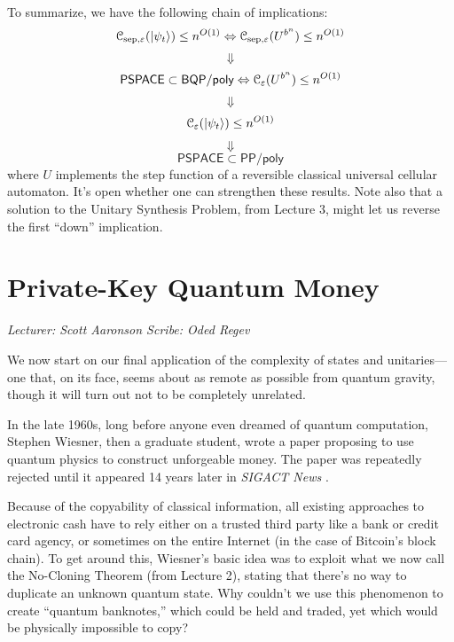 \documentclass[11pt]{report}
\theoremstyle{plain}
\theoremstyle{definition}
\newcommand{\eps}{\varepsilon}
\renewcommand{\ket}[1]{|#1\rangle}
\newcommand{\lecture}[3]{%
  \chapter{#3}%
  \vspace{-5ex}%
  \textit{Lecturer: #1 \hfill Scribe: #2}\par%
  \vspace{1ex}\titlerule\vspace{2ex}}
\begin{document}
To summarize, we have the following chain of implications:
\[
{\cal C}_{\mathrm{sep},\eps}(\ket{\psi_t}) \le n^{O(1)} \Leftrightarrow {\cal C}_{\mathrm{sep},\eps}(U^{b^n}) \le n^{O(1)}
\]
\[
\Downarrow
\]
\[
\mathsf{PSPACE} \subset \mathsf{BQP/poly} \Leftrightarrow {\cal C}_\eps(U^{b^n}) \le n^{O(1)}
\]
\[
\Downarrow
\]
\[
{\cal C}_{\eps}(\ket{\psi_t}) \le n^{O(1)}
\]
\[
\Downarrow
\]
\[
\mathsf{PSPACE} \subset \mathsf{PP/poly}
\]
where $U$ implements the step function of a reversible classical universal cellular automaton.
It's open whether one can strengthen these results.  Note also that a solution to the Unitary Synthesis Problem, from Lecture 3, might let us reverse the first ``down'' implication.


\lecture{Scott Aaronson}{Oded Regev}{Private-Key Quantum Money}

We now start on our final application of the complexity of states and unitaries---one that, on its face, seems about as remote as possible from quantum gravity, though it will turn out not to be completely unrelated.

In the late 1960s, long before anyone even dreamed of quantum computation, Stephen Wiesner, then a graduate student, wrote a paper proposing to use quantum physics to construct unforgeable money. The paper was repeatedly rejected until it appeared 14 years later in {\em SIGACT News} \cite{wiesner}.

Because of the copyability of classical information, all existing approaches to electronic cash have to rely either on a trusted third party like a bank or credit card agency, or sometimes on the entire Internet (in the case of Bitcoin's block chain).  To get around this, Wiesner's basic idea was to exploit what we now call the No-Cloning Theorem (from Lecture 2), stating that there's no way to duplicate an unknown quantum state.  Why couldn't we use this phenomenon to create ``quantum banknotes,'' which could be held and traded, yet which would be physically impossible to copy?
\end{document}
